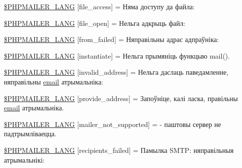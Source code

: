 \begin{DoxyCompactItemize}
\item 
\hyperlink{phpmailer_8lang-be_8php_a7e83349023b856ef9e5c46e30ae6d51e}{\$\+P\+H\+P\+M\+A\+I\+L\+E\+R\+\_\+\+L\+A\+NG} \mbox{[}\textquotesingle{}file\+\_\+access\textquotesingle{}\mbox{]} = \textquotesingle{}Няма доступу да файла\+: \textquotesingle{}
\item 
\hyperlink{phpmailer_8lang-be_8php_a28d1a6517bf4c942a0ddd506188ad2e0}{\$\+P\+H\+P\+M\+A\+I\+L\+E\+R\+\_\+\+L\+A\+NG} \mbox{[}\textquotesingle{}file\+\_\+open\textquotesingle{}\mbox{]} = \textquotesingle{}Нельга адкрыць файл\+: \textquotesingle{}
\item 
\hyperlink{phpmailer_8lang-be_8php_adf832ae12155a09be077c6d5e4fd7e22}{\$\+P\+H\+P\+M\+A\+I\+L\+E\+R\+\_\+\+L\+A\+NG} \mbox{[}\textquotesingle{}from\+\_\+failed\textquotesingle{}\mbox{]} = \textquotesingle{}Няправільны адрас адпраўніка\+: \textquotesingle{}
\item 
\hyperlink{phpmailer_8lang-be_8php_ad58dde16780f4770ccf4dd282ea1f5ad}{\$\+P\+H\+P\+M\+A\+I\+L\+E\+R\+\_\+\+L\+A\+NG} \mbox{[}\textquotesingle{}instantiate\textquotesingle{}\mbox{]} = \textquotesingle{}Нельга прымяніць функцыю mail().\textquotesingle{}
\item 
\hyperlink{phpmailer_8lang-be_8php_a42d61bcea4c79599ecb44fd062f54d47}{\$\+P\+H\+P\+M\+A\+I\+L\+E\+R\+\_\+\+L\+A\+NG} \mbox{[}\textquotesingle{}invalid\+\_\+address\textquotesingle{}\mbox{]} = \textquotesingle{}Нельга даслаць паведамленне, няправільны \hyperlink{actions_2account_8php_a011c66ae212438e0d7de7c0e40451bb3}{email} атрымальніка\+: \textquotesingle{}
\item 
\hyperlink{phpmailer_8lang-be_8php_a8b97897c2406b7392b056f375feeefbb}{\$\+P\+H\+P\+M\+A\+I\+L\+E\+R\+\_\+\+L\+A\+NG} \mbox{[}\textquotesingle{}provide\+\_\+address\textquotesingle{}\mbox{]} = \textquotesingle{}Запоўніце, калі ласка, правільны \hyperlink{actions_2account_8php_a011c66ae212438e0d7de7c0e40451bb3}{email} атрымальніка.\textquotesingle{}
\item 
\hyperlink{phpmailer_8lang-be_8php_aa2ebcb8833ee83a7ad67401c4bb3a6ad}{\$\+P\+H\+P\+M\+A\+I\+L\+E\+R\+\_\+\+L\+A\+NG} \mbox{[}\textquotesingle{}mailer\+\_\+not\+\_\+supported\textquotesingle{}\mbox{]} = \textquotesingle{} -\/ паштовы сервер не падтрымліваецца.\textquotesingle{}
\item 
\hyperlink{phpmailer_8lang-be_8php_a7589d30bb9b368327c2df015f3e6bcba}{\$\+P\+H\+P\+M\+A\+I\+L\+E\+R\+\_\+\+L\+A\+NG} \mbox{[}\textquotesingle{}recipients\+\_\+failed\textquotesingle{}\mbox{]} = \textquotesingle{}Памылка S\+M\+T\+P\+: няправільныя атрымальнікі\+: \textquotesingle{}

\end{DoxyCompactItemize}
